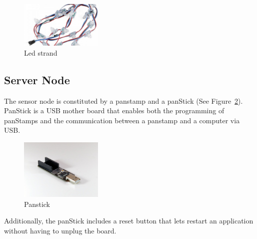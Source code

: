 \begin{figure}[h!] 
 \centering
 \includegraphics[width= 0.35\textwidth, clip=true,keepaspectratio=true]{./pic/led-strand-all.jpeg}
 \caption{Led strand}
 \label{fig:led-strand}
\end{figure}

\subsection{Server Node}
The sensor node is constituted by a panstamp and a panStick (See Figure~\ref{fig:panstick}).
PanStick is a USB mother board that enables both the programming of panStamps and the communication between a panstamp and a computer via USB.

\begin{figure}[h!] 
 \centering
 \includegraphics[width= 0.35\textwidth, clip=true,keepaspectratio=true]{./pic/panStick_01.png}
 \caption{Panstick}
 \label{fig:panstick}
\end{figure}

Additionally, the panStick includes a reset button that lets restart an application without having to unplug the board.